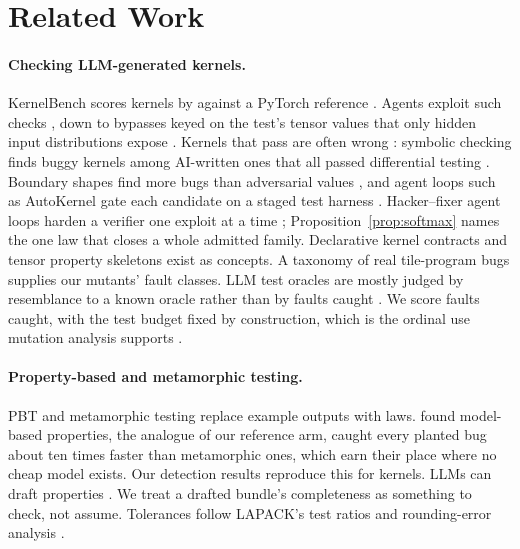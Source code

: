 \section{Related Work}
\label{sec:related}

\paragraph{Checking LLM-generated kernels.}
KernelBench scores kernels by \allclose against a PyTorch reference
\citep{ouyang2025kernelbench}. Agents exploit such checks \citep{lange2025robust}, down to
bypasses keyed on the test's tensor values that only hidden input distributions expose
\citep{zhang2026kbverified}. Kernels that pass are often wrong \citep{sarkar2026illusion}:
symbolic checking finds \dirigoBuggy{} buggy kernels among \dirigoKernels{} AI-written ones
that all passed differential testing \citep{biberstein2026outputspace}. Boundary shapes
find more bugs than adversarial values \citep{sarkar2026inputs}, and agent loops such as
AutoKernel gate each candidate on a staged test harness \citep{jaber2026autokernel}.
Hacker--fixer agent loops harden a verifier one exploit at a time
\citep{zhong2026hackerfixer}; Proposition~\ref{prop:softmax} names the one law that
closes a whole admitted family. Declarative kernel contracts
\citep{veit2026contracts,shah2026contract} and tensor property skeletons
\citep{qiu2026propilot} exist as concepts. A taxonomy of \isstaBugs{} real tile-program
bugs \citep{rathnasuriya2026tile} supplies our mutants' fault classes. LLM test oracles
are mostly judged by resemblance to a known oracle rather than by faults caught
\citep{mughal2026oracles}. We score faults caught, with the test budget fixed by
construction, which is the ordinal use mutation analysis supports
\citep{andrews2005mutation,just2014mutants,papadakis2018mutation}.

\paragraph{Property-based and metamorphic testing.}
PBT \citep{claessen2000quickcheck,maciver2019hypothesis} and metamorphic testing
\citep{chen2018metamorphic,barr2015oracle} replace example outputs with laws.
\citet{hughes2020specify} found model-based properties, the analogue of our reference
arm, caught every planted bug about ten times faster than metamorphic ones, which earn
their place where no cheap model exists. Our detection results reproduce this for
kernels. LLMs can draft properties \citep{vikram2023pbt}. We treat a drafted bundle's
completeness as something to check, not assume. Tolerances follow LAPACK's test ratios
\citep{anderson1992lawn41} and rounding-error analysis
\citep{higham2002accuracy,higham2019probabilistic}.

